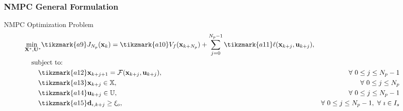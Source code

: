 	\begin{frame}
		\frametitle{NMPC General Formulation}
		\begin{block}{NMPC Optimization Problem}
			\begin{align*}
				&\underset{\mathbf{X}^*,\mathbf{U}^*}{\text{min    }}
				\tikzmark{a9}J_{N_p}(\mathbf{x}_k) = \tikzmark{a10}V_f(\mathbf{x}_{k+N_p}) + \sum_{j=0}^{N_p-1}\tikzmark{a11}\ell (\mathbf{x}_{k + j},\mathbf{u}_{k + j}), \\
				&\quad \text{subject to:} \notag  \\
				&\quad\quad \tikzmark{a12}\mathbf{x}_{k+j+1} = \mathcal{F}(\mathbf{x}_{k+j},\mathbf{u}_{k+j}), & \forall\text{ } 0\leq j\leq N_p-1  \\ 
				&\quad\quad \tikzmark{a13}\mathbf{x}_{k+j} \in \mathbb{X}, & \forall \text{ }0\leq j\leq N_p \\
				&\quad\quad \tikzmark{a14}\mathbf{u}_{k+j} \in \mathbb{U}, & \forall \text{ }0\leq j\leq N_p-1 \\
				&\quad\quad \tikzmark{a15}\mathbf{d}_{\imath,k+j}  \geq \xi_o, & \forall\text{ } 0\leq j\leq N_p-1, \text{ }\forall\text{ } \imath \in I_s
			\end{align*}
		\end{block}
	

\end{frame}
